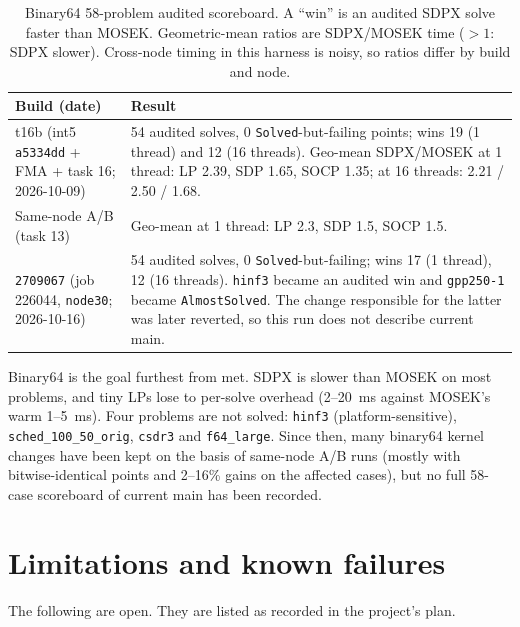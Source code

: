 \documentclass[11pt]{article}
\newcommand{\code}[1]{\texttt{#1}}
\begin{document}
\begin{table}[t]
\centering
\caption{Binary64 58-problem audited scoreboard. A ``win'' is an audited SDPX
solve faster than MOSEK. Geometric-mean ratios are SDPX/MOSEK time ($>1$:
SDPX slower). Cross-node timing in this harness is noisy, so ratios differ
by build and node.}
\label{tab:f64}
\begin{tabularx}{\linewidth}{lX}
\toprule
Build (date) & Result \\
\midrule
t16b (int5 \code{a5334dd} + FMA + task 16; 2026-10-09) &
  54 audited solves, 0 \code{Solved}-but-failing points; wins 19 (1 thread) and
  12 (16 threads). Geo-mean SDPX/MOSEK at 1 thread: LP 2.39, SDP 1.65, SOCP
  1.35; at 16 threads: 2.21 / 2.50 / 1.68. \\
Same-node A/B (task 13) &
  Geo-mean at 1 thread: LP 2.3, SDP 1.5, SOCP 1.5. \\
\code{2709067} (job 226044, \code{node30}; 2026-10-16) &
  54 audited solves, 0 \code{Solved}-but-failing; wins 17 (1 thread), 12 (16
  threads). \code{hinf3} became an audited win and \code{gpp250-1} became
  \code{AlmostSolved}. The change responsible for the latter was later
  reverted, so this run does not describe current main. \\
\bottomrule
\end{tabularx}
\end{table}

Binary64 is the goal furthest from met. SDPX is slower than MOSEK on most
problems, and tiny LPs lose to per-solve overhead (2--20~ms against MOSEK's
warm 1--5~ms). Four problems are not solved: \code{hinf3} (platform-sensitive),
\code{sched\_100\_50\_orig}, \code{csdr3} and \code{f64\_large}. Since then,
many binary64 kernel changes have been kept on the basis of same-node A/B runs
(mostly with bitwise-identical points and 2--16\% gains on the affected
cases), but no full
58-case scoreboard of current main has been recorded.

\section{Limitations and known failures}
\label{sec:limits}

The following are open. They are listed as recorded in the project's plan.
\end{document}
